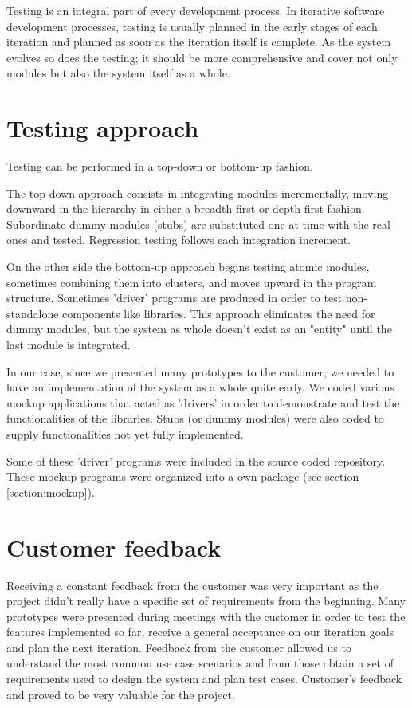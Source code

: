 
Testing is an integral part of every development process.
In iterative software development processes, testing is usually planned in the
early stages of each iteration and planned as soon as the iteration itself is
complete. As the system evolves so does the testing; it should be more
comprehensive and cover not only modules but also the system itself as a whole.

\section{Testing approach}
Testing can be performed in a top-down or bottom-up fashion.

The top-down approach consists in integrating modules incrementally, moving
downward in the hierarchy in either a breadth-first or depth-first fashion. \newline
Subordinate dummy modules (stubs) are substituted one at time with the real ones
and tested. Regression testing follows each integration increment.

On the other side the bottom-up approach begins testing atomic modules,
sometimes combining them into clusters, and moves upward in the program
structure. Sometimes 'driver' programs are produced in order to test \newline
non-standalone components like libraries. This approach eliminates the need for
dummy modules, but the system as whole doesn't exist as an "entity" until the
last module is integrated.

In our case, since we presented many prototypes to the customer, we needed to
have an implementation of the system as a whole quite early. We coded various
mockup applications that acted as 'drivers' in order to demonstrate and test the
functionalities of the libraries. Stubs (or dummy modules) were also coded
to supply functionalities not yet fully implemented.

Some of these 'driver' programs were included in the source coded repository. 
These mockup programs were organized into a own package (see section \ref{section:mockup}).

\section{Customer feedback}
Receiving a constant feedback from the customer was very important as the
project didn't really have a specific set of requirements from the beginning.
Many prototypes were presented during meetings with the customer in order to
test the features implemented so far, receive a general acceptance on our
iteration goals and plan the next iteration. Feedback from the customer
allowed us to understand the most common use case scenarios and from those
obtain a set of requirements used to design the system and plan test cases.
Customer's feedback and proved to be very valuable for the project.

